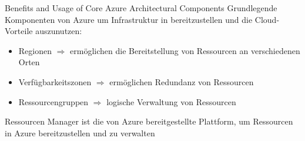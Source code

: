 \begin{flashcard}[\ ]{Benefits and Usage of Core Azure Architectural Components}
    Grundlegende Komponenten von Azure um Infrastruktur in bereitzustellen und die Cloud-Vorteile auszunutzen:
    \begin{itemize}
        \item Regionen $\Rightarrow$ ermöglichen die Bereitstellung von Ressourcen an verschiedenen Orten
        \item Verfügbarkeitszonen $\Rightarrow$ ermöglichen Redundanz von Ressourcen
        \item Ressourcengruppen $\Rightarrow$ logische Verwaltung von Ressourcen
    \end{itemize}

    \vspace{5mm}
    Ressourcen Manager ist die von Azure bereitgestellte Plattform, um Ressourcen in Azure bereitzustellen und zu verwalten

\end{flashcard}
